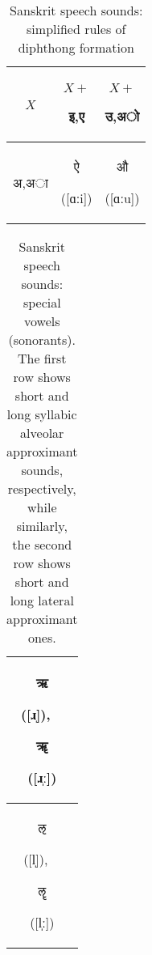 \documentclass[10pt,a4paper]{article}
\newcommand{\sansk}[1]{\begin{sanskrit}#1\end{sanskrit}}
\begin{document}
\begin{table}[]
	\centering
	
	\begin{center}
		\begin{tabular}{|c|c|c|}
			\hline
			$X$&$X+$\sansk{इ,ए}&$X+$\sansk{उ,अो}\\\hline
			\sansk{अ,अा}&\sansk{ऐ} ([ɑːi])&\sansk{औ} ([ɑːu])\\\hline
			
		\end{tabular}
		\caption{Sanskrit speech sounds: simplified rules of diphthong formation}
		\label{diphthongs-table}
	\end{center}
\end{table}

\begin{table}[]
	\centering
	
	\begin{center}
		\begin{tabular}{|c|}
			\hline
			\sansk{ऋ} ([ɹ̩]),$\quad$ \sansk{ॠ} ([ɹ̩ː])\\\hline\hline
			\sansk{ऌ} ([l̩]),$\quad$ \sansk{ॡ} ([l̩ː])\\\hline
			
		\end{tabular}
		\caption{Sanskrit speech sounds: special vowels (sonorants). The first row shows short and long syllabic alveolar approximant sounds, respectively, while similarly, the second row shows short and long lateral approximant ones.}
		\label{ru}
	\end{center}
\end{table}
\end{document}
